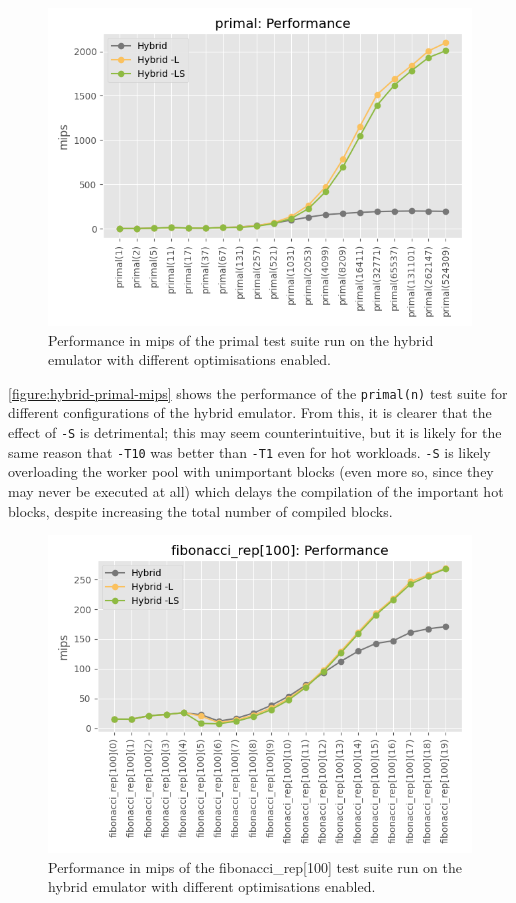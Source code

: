 \begin{figure}[H]
    \centering
    \includegraphics[scale=0.75]{output/graphs/tests/hybrid/primal/mips.png}
    \caption{Performance in mips of the primal test suite run on the hybrid emulator with different optimisations enabled.}
    \label{figure:hybrid-primal-mips}
\end{figure}

\autoref{figure:hybrid-primal-mips} shows the performance of the \texttt{primal(n)} test suite for different configurations of the hybrid emulator. From this, it is clearer that the effect of \texttt{-S} is detrimental; this may seem counterintuitive, but it is likely for the same reason that \texttt{-T10} was better than \texttt{-T1} even for hot workloads. \texttt{-S} is likely overloading the worker pool with unimportant blocks (even more so, since they may never be executed at all) which delays the compilation of the important hot blocks, despite increasing the total number of compiled blocks.

\begin{figure}[H]
    \centering
    \includegraphics[scale=0.75]{output/graphs/tests/hybrid/fibonacci_rep[100]/mips.png}
    \caption{Performance in mips of the fibonacci\_rep[100] test suite run on the hybrid emulator with different optimisations enabled.}
    \label{figure:hybrid-fibonacci-100-mips}
\end{figure}

